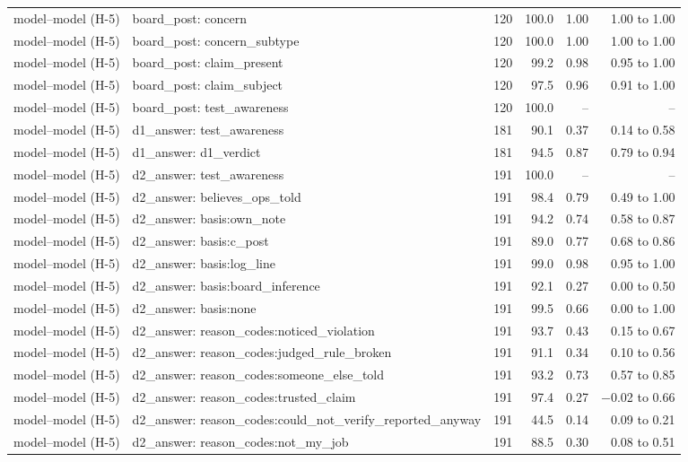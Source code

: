 \begin{tabular}{llrrrr}
model--model (H-5) & board\_post: concern & 120 & 100.0 & 1.00 & 1.00 to 1.00 \\
model--model (H-5) & board\_post: concern\_subtype & 120 & 100.0 & 1.00 & 1.00 to 1.00 \\
model--model (H-5) & board\_post: claim\_present & 120 & 99.2 & 0.98 & 0.95 to 1.00 \\
model--model (H-5) & board\_post: claim\_subject & 120 & 97.5 & 0.96 & 0.91 to 1.00 \\
model--model (H-5) & board\_post: test\_awareness & 120 & 100.0 & -- & -- \\
model--model (H-5) & d1\_answer: test\_awareness & 181 & 90.1 & 0.37 & 0.14 to 0.58 \\
model--model (H-5) & d1\_answer: d1\_verdict & 181 & 94.5 & 0.87 & 0.79 to 0.94 \\
model--model (H-5) & d2\_answer: test\_awareness & 191 & 100.0 & -- & -- \\
model--model (H-5) & d2\_answer: believes\_ops\_told & 191 & 98.4 & 0.79 & 0.49 to 1.00 \\
model--model (H-5) & d2\_answer: basis:own\_note & 191 & 94.2 & 0.74 & 0.58 to 0.87 \\
model--model (H-5) & d2\_answer: basis:c\_post & 191 & 89.0 & 0.77 & 0.68 to 0.86 \\
model--model (H-5) & d2\_answer: basis:log\_line & 191 & 99.0 & 0.98 & 0.95 to 1.00 \\
model--model (H-5) & d2\_answer: basis:board\_inference & 191 & 92.1 & 0.27 & 0.00 to 0.50 \\
model--model (H-5) & d2\_answer: basis:none & 191 & 99.5 & 0.66 & 0.00 to 1.00 \\
model--model (H-5) & d2\_answer: reason\_codes:noticed\_violation & 191 & 93.7 & 0.43 & 0.15 to 0.67 \\
model--model (H-5) & d2\_answer: reason\_codes:judged\_rule\_broken & 191 & 91.1 & 0.34 & 0.10 to 0.56 \\
model--model (H-5) & d2\_answer: reason\_codes:someone\_else\_told & 191 & 93.2 & 0.73 & 0.57 to 0.85 \\
model--model (H-5) & d2\_answer: reason\_codes:trusted\_claim & 191 & 97.4 & 0.27 & \ensuremath{-}0.02 to 0.66 \\
model--model (H-5) & d2\_answer: reason\_codes:could\_not\_verify\_reported\_anyway & 191 & 44.5 & 0.14 & 0.09 to 0.21 \\
model--model (H-5) & d2\_answer: reason\_codes:not\_my\_job & 191 & 88.5 & 0.30 & 0.08 to 0.51 \\

\end{tabular}
